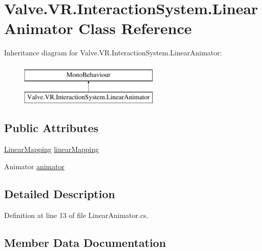 \hypertarget{class_valve_1_1_v_r_1_1_interaction_system_1_1_linear_animator}{}\section{Valve.\+V\+R.\+Interaction\+System.\+Linear\+Animator Class Reference}
\label{class_valve_1_1_v_r_1_1_interaction_system_1_1_linear_animator}
Inheritance diagram for Valve.\+V\+R.\+Interaction\+System.\+Linear\+Animator\+:\begin{figure}[H]
\begin{center}
\leavevmode
\includegraphics[height=2.000000cm]{class_valve_1_1_v_r_1_1_interaction_system_1_1_linear_animator}
\end{center}
\end{figure}
\subsection*{Public Attributes}
\begin{DoxyCompactItemize}
\item 
\mbox{\hyperlink{class_valve_1_1_v_r_1_1_interaction_system_1_1_linear_mapping}{Linear\+Mapping}} \mbox{\hyperlink{class_valve_1_1_v_r_1_1_interaction_system_1_1_linear_animator_a9cadae94a7a0fafd30e5106aa2109c2c}{linear\+Mapping}}
\item 
Animator \mbox{\hyperlink{class_valve_1_1_v_r_1_1_interaction_system_1_1_linear_animator_a08b6637de647804a70dd5566fca8b39e}{animator}}
\end{DoxyCompactItemize}


\subsection{Detailed Description}


Definition at line 13 of file Linear\+Animator.\+cs.



\subsection{Member Data Documentation}
\mbox{\label{class_valve_1_1_v_r_1_1_interaction_system_1_1_linear_animator_a08b6637de647804a70dd5566fca8b39e}} 
